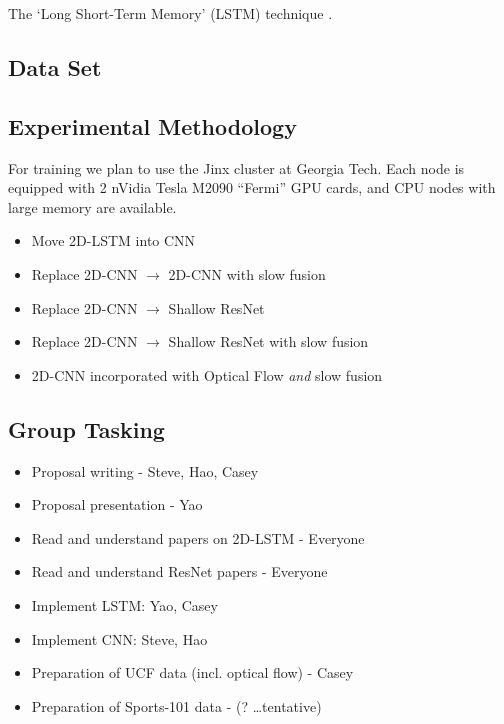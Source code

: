 The `Long Short-Term Memory' (LSTM) technique \TODO{\dots}.
\subsection*{Data Set}
\subsection*{Experimental Methodology}
For training we plan to use the Jinx cluster at Georgia Tech. Each node is equipped with 2 nVidia Tesla M2090 ``Fermi'' GPU cards, and CPU nodes with large memory are available.
\begin{itemize}
\item Move 2D-LSTM into CNN
\item Replace 2D-CNN $\to$ 2D-CNN with slow fusion
\item Replace 2D-CNN $\to$ Shallow ResNet
\item Replace 2D-CNN $\to$ Shallow ResNet with slow fusion
\item 2D-CNN incorporated with Optical Flow \emph{and} slow fusion
\end{itemize}
\subsection*{Group Tasking}
\begin{itemize}
\item Proposal writing - Steve, Hao, Casey
\item Proposal presentation - Yao
\item Read and understand papers on 2D-LSTM - Everyone
\item Read and understand ResNet papers - Everyone
\item Implement LSTM: Yao, Casey
\item Implement CNN: Steve, Hao
\item Preparation of UCF data (incl. optical flow) - Casey
\item Preparation of Sports-101 data - (? \dots tentative)
\end{itemize}
